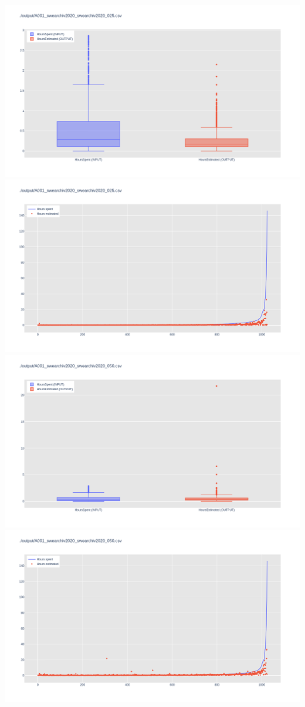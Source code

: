 \includegraphics[width=\textwidth]{Scripts/output/A001_swearchiv2020_swearchiv2020_025.csv.png}
\includegraphics[width=\textwidth]{Scripts/output/A001_swearchiv2020_swearchiv2020_025.csv.scatter.png}
\includegraphics[width=\textwidth]{Scripts/output/A001_swearchiv2020_swearchiv2020_050.csv.png}
\includegraphics[width=\textwidth]{Scripts/output/A001_swearchiv2020_swearchiv2020_050.csv.scatter.png}
